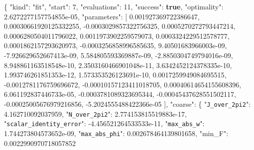 \documentclass[
  10pt,
]{article}
\newenvironment{Shaded}{}{}
\newcommand{\DataTypeTok}[1]{\textcolor[rgb]{0.56,0.13,0.00}{#1}}
\newcommand{\DecValTok}[1]{\textcolor[rgb]{0.25,0.63,0.44}{#1}}
\newcommand{\FloatTok}[1]{\textcolor[rgb]{0.25,0.63,0.44}{#1}}
\newcommand{\FunctionTok}[1]{\textcolor[rgb]{0.02,0.16,0.49}{#1}}
\newcommand{\KeywordTok}[1]{\textcolor[rgb]{0.00,0.44,0.13}{\textbf{#1}}}
\newcommand{\OtherTok}[1]{\textcolor[rgb]{0.00,0.44,0.13}{#1}}
\newcommand{\StringTok}[1]{\textcolor[rgb]{0.25,0.44,0.63}{#1}}
\begin{document}
\begin{Shaded}
\begin{Highlighting}[]
\FunctionTok{\{}
  \DataTypeTok{"kind"}\FunctionTok{:} \StringTok{"fit"}\FunctionTok{,}
  \DataTypeTok{"start"}\FunctionTok{:} \DecValTok{7}\FunctionTok{,}
  \DataTypeTok{"evaluations"}\FunctionTok{:} \DecValTok{11}\FunctionTok{,}
  \DataTypeTok{"success"}\FunctionTok{:} \KeywordTok{true}\FunctionTok{,}
  \DataTypeTok{"optimality"}\FunctionTok{:} \FloatTok{2.6272277157754855e{-}05}\FunctionTok{,}
  \DataTypeTok{"parameters"}\FunctionTok{:} \OtherTok{[}
    \FloatTok{0.001927369722386647}\OtherTok{,}
    \FloatTok{0.00030661920125332255}\OtherTok{,}
    \FloatTok{{-}0.0003029857322756325}\OtherTok{,}
    \FloatTok{0.0005270272793447214}\OtherTok{,}
    \FloatTok{0.0006280504011796022}\OtherTok{,}
    \FloatTok{0.0011973902259579073}\OtherTok{,}
    \FloatTok{0.0003324229512578777}\OtherTok{,}
    \FloatTok{0.0001862157293620973}\OtherTok{,}
    \FloatTok{{-}0.0003256858996585635}\OtherTok{,}
    \FloatTok{9.40501683966003e{-}09}\OtherTok{,}
    \FloatTok{{-}7.926629652667413e{-}09}\OtherTok{,}
    \FloatTok{5.584805593369887e{-}09}\OtherTok{,}
    \FloatTok{{-}2.8850304749794016e{-}09}\OtherTok{,}
    \FloatTok{8.948861163518548e{-}10}\OtherTok{,}
    \FloatTok{2.3503160466901048e{-}11}\OtherTok{,}
    \FloatTok{3.6342452124378335e{-}10}\OtherTok{,}
    \FloatTok{1.993746261851353e{-}12}\OtherTok{,}
    \FloatTok{1.573353526123691e{-}10}\OtherTok{,}
    \FloatTok{0.0017259949084695515}\OtherTok{,}
    \FloatTok{{-}0.0012781176759696672}\OtherTok{,}
    \FloatTok{{-}0.00010157123411018705}\OtherTok{,}
    \FloatTok{0.00040614654155608396}\OtherTok{,}
    \FloatTok{6.061192837446733e{-}05}\OtherTok{,}
    \FloatTok{{-}0.0003781089323695344}\OtherTok{,}
    \FloatTok{{-}0.00045437628551502117}\OtherTok{,}
    \FloatTok{{-}0.00025005676979216856}\OtherTok{,}
    \FloatTok{{-}5.2024555488422366e{-}05}
  \OtherTok{]}\FunctionTok{,}
  \DataTypeTok{"coarse"}\FunctionTok{:} \FunctionTok{\{}
    \DataTypeTok{"\nolinkurl{J_over_2pi2}"}\FunctionTok{:} \FloatTok{4.162710092037959}\FunctionTok{,}
    \DataTypeTok{"\nolinkurl{N_over_2pi2}"}\FunctionTok{:} \FloatTok{2.774153815519883e{-}17}\FunctionTok{,}
    \DataTypeTok{"\nolinkurl{scalar_identity_error}"}\FunctionTok{:} \FloatTok{{-}4.456521264533533e{-}11}\FunctionTok{,}
    \DataTypeTok{"\nolinkurl{max_abs_w}"}\FunctionTok{:} \FloatTok{1.744273804573652e{-}09}\FunctionTok{,}
    \DataTypeTok{"\nolinkurl{max_abs_phi}"}\FunctionTok{:} \FloatTok{0.002678464139801658}\FunctionTok{,}
    \DataTypeTok{"min\_F"}\FunctionTok{:} \FloatTok{0.0022990970718057852}

\end{Highlighting}
\end{Shaded}
\end{document}
